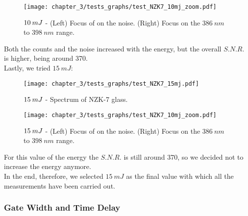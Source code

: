 \begin{figure}[H]
    \centering
    \texttt{[image: chapter\_3/tests\_graphs/test\_NZK7\_10mj\_zoom.pdf]} 
     \vspace*{-30pt}
    \caption{$\protect 10 \: mJ$ - (Left) Focus of on the noise. (Right) Focus on the $386 \: nm$ to $398 \: nm$ range.}
    \label{fig:test_NZK7_10mj_zoom}
 \end{figure}
Both the counts and the noise increased with the energy, but the overall $S.N.R.$ is higher, being around 370.
\\
Lastly, we tried $15 \: mJ$:
\begin{figure}[H]
    \centering
    \texttt{[image: chapter\_3/tests\_graphs/test\_NZK7\_15mj.pdf]} 
     \vspace*{-30pt}
    \caption{$\protect 15 \: mJ$ - Spectrum of NZK-7 glass.}
    \label{fig:test_NZK7_15mj}
\end{figure}
\begin{figure}[H]
    \centering
    \texttt{[image: chapter\_3/tests\_graphs/test\_NZK7\_10mj\_zoom.pdf]} 
     \vspace*{-30pt}
    \caption{$\protect 15 \: mJ$ - (Left) Focus of on the noise. (Right) Focus on the $386 \: nm$ to $398 \: nm$ range.}
    \label{fig:test_NZK7_15mj_zoom}
 \end{figure}

For this value of the energy the $S.N.R.$ is still around 370, so we decided not to increase the energy anymore.
\\
In the end, therefore, we selected $15 \: mJ$ as the final value with which all the measurements have been carried out. 

\subsubsection{Gate Width and Time Delay}
\label{subsubsec:gate_width_delay}

